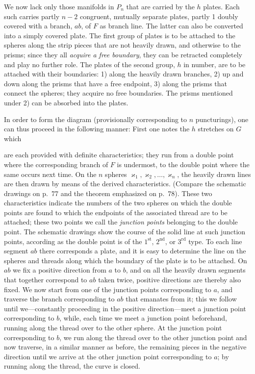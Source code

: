 \documentclass{article}
\begin{document}
We now lack only those manifolds in $P_n$ that are carried by the $h$ plates. Each such carries partly $n - 2$ congruent, mutually separate plates, partly 1 doubly covered with a branch, $ab$, of $F$ as branch line. The latter can also be converted into a simply covered plate. The first group of plates is to be attached to the spheres along the strip pieces that are not heavily drawn, and otherwise to the prisms; since they all \emph{acquire a free boundary}, they can be retracted completely and play no further role. The plates of the second group, $h$ in number, are to be attached with their boundaries: 1) along the heavily drawn branches, 2) up and down along the prisms that have a free endpoint, 3) along the prisms that connect the spheres; they acquire no free boundaries. The prisms mentioned under 2) can be absorbed into the plates.

In order to form the diagram (provisionally corresponding to $n$ puncturings), one can thus proceed in the following manner: First one notes the $h$ stretches on $G$ which

are each provided with definite characteristics; they run from a double point where the corresponding branch of $F$ is undermost, to the double point where the same occurs next time. On the $n$ spheres $\varkappa_1, \varkappa_2, \dots, \varkappa_n$, the heavily drawn lines are then drawn by means of the derived characteristics. (Compare the schematic drawings on p.\ 77 and the theorem emphasized on p.\ 78). These two characteristics indicate the numbers of the two spheres on which the double points are found to which the endpoints of the associated thread are to be attached; these two points we call the \emph{junction points} belonging to the double point. The schematic drawings show the course of the solid line at such junction points, according as the double point is of the $1^{\text{st}}$, $2^{\text{nd}}$, or $3^{\text{rd}}$ type. To each line segment $ab$ there corresponds a plate, and it is easy to determine the line on the spheres and threads along which the boundary of the plate is to be attached. On $ab$ we fix a positive direction from $a$ to $b$, and on all the heavily drawn segments that together correspond to $ab$ taken twice, positive directions are thereby also fixed. We now start from one of the junction points corresponding to $a$, and traverse the branch corresponding to $ab$ that emanates from it; this we follow until we---constantly proceeding in the positive direction---meet a junction point corresponding to $b$, while, each time we meet a junction point beforehand, running along the thread over to the other sphere. At the junction point corresponding to $b$, we run along the thread over to the other junction point and now traverse, in a similar manner as before, the remaining pieces in the negative direction until we arrive at the other junction point corresponding to $a$; by running along the thread, the curve is closed.
\end{document}
